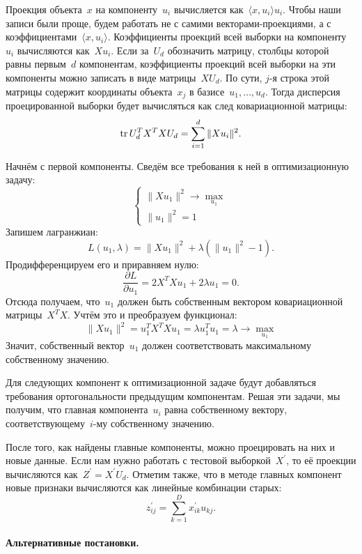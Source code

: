 \documentclass[12pt,fleqn]{article}
\begin{document}
Проекция объекта~$x$ на компоненту~$u_i$ вычисляется как~$\langle x, u_i \rangle u_i$.
Чтобы наши записи были проще, будем работать не с самими векторами-проекциями, а с коэффициентами~$\langle x, u_i \rangle$.
Коэффициенты проекций всей выборки на компоненту~$u_i$ вычисляются как~$X u_i$.
Если за~$U_d$ обозначить матрицу, столбцы которой равны первым~$d$ компонентам,
коэффициенты проекций всей выборки на эти компоненты можно записать в виде матрицы~$X U_d$.
По сути, $j$-я строка этой матрицы содержит координаты объекта~$x_j$ в базисе~$u_1, \dots, u_d$.
Тогда дисперсия проецированной выборки будет вычисляться как след ковариационной матрицы:
\[
    \mathop{\mathrm{tr}} U_d^T X^T X U_d
    =
    \sum_{i = 1}^{d} \|X u_i\|^2.
\]

Начнём с первой компоненты.
Сведём все требования к ней в оптимизационную задачу:
\[
    \begin{cases}
        \| X u_1 \|^2 \to \max_{u_1} \\
        \|u_1\|^2 = 1
    \end{cases}
\]
Запишем лагранжиан:
\[
    L(u_1, \lambda)
    =
    \| X u_1 \|^2 + \lambda (\|u_1\|^2 - 1).
\]
Продифференцируем его и приравняем нулю:
\[
    \frac{\partial L}{\partial u_1}
    =
    2 X^T Xu_1 + 2 \lambda u_1
    =
    0.
\]
Отсюда получаем, что~$u_1$ должен быть собственным вектором ковариационной матрицы~$X^T X$.
Учтём это и преобразуем функционал:
\[
    \| X u_1 \|^2
    =
    u_1^T X^T X u_1
    =
    \lambda u_1^T u_1
    =
    \lambda
    \to
    \max_{u_1}
\]
Значит, собственный вектор~$u_1$ должен соответствовать максимальному
собственному значению.

Для следующих компонент к оптимизационной задаче будут добавляться требования
ортогональности предыдущим компонентам.
Решая эти задачи, мы получим, что главная компонента~$u_i$
равна собственному вектору, соответствующему~$i$-му собственному значению.

После того, как найдены главные компоненты, можно проецировать на них и новые данные.
Если нам нужно работать с тестовой выборкой~$X^\prime$, то её проекции вычисляются как~$Z^\prime = X^\prime U_d$.
Отметим также, что в методе главных компонент новые признаки вычисляются как линейные комбинации старых:
\[
    z^{\prime}_{ij}
    =
    \sum_{k = 1}^{D}
    x^{\prime}_{ik} u_{kj}.
\]

\paragraph{Альтернативные постановки.}
\end{document}
